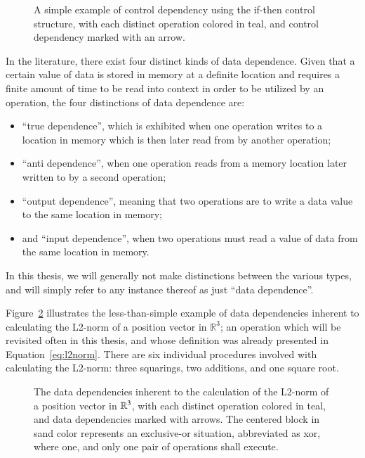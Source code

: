 \begin{figure}[ht]
	
	{\caption[If-Then Control Dependency]{A simple example of control dependency using the if-then control structure, with each distinct operation colored in teal, and control dependency marked with an arrow.}\label{fig:simpleControlDependency}}
\end{figure}

In the literature, there exist four distinct kinds of data dependence. Given that a certain value of data is stored in memory at a definite location and requires a finite amount of time to be read into context in order to be utilized by an operation, the four distinctions of data dependence are:
%
\begin{itemize}
	\item ``true dependence'', which is exhibited when one operation writes to a location in memory which is then later read from by another operation;
	\item ``anti dependence'', when one operation reads from a memory location later written to by a second operation;
	\item ``output dependence'', meaning that two operations are to write a data value to the same location in memory;
	\item and ``input dependence'', when two operations must read a value of data from the same location in memory.
\end{itemize}

In this thesis, we will generally not make distinctions between the various types, and will simply refer to any instance thereof as just ``data dependence''.

Figure~\ref{fig:dataDependencyOfL2Norm} illustrates the less-than-simple example of data dependencies inherent to calculating the L2-norm of a position vector in $\mathbb{R}^{3}$; an operation which will be revisited often in this thesis, and whose definition was already presented in Equation~\ref{eq:l2norm}. There are six individual procedures involved with calculating the L2-norm: three squarings, two additions, and one square root.

\begin{figure}[ht]
	
	{\caption[Data Dependencies in the L2-norm Calculation]{The data dependencies inherent to the calculation of the L2-norm of a position vector in $\mathbb{R}^{3}$, with each distinct operation colored in teal, and data dependencies marked with arrows. The centered block in sand color represents an exclusive-or situation, abbreviated as xor, where one, and only one pair of operations shall execute.}\label{fig:dataDependencyOfL2Norm}}
\end{figure}

